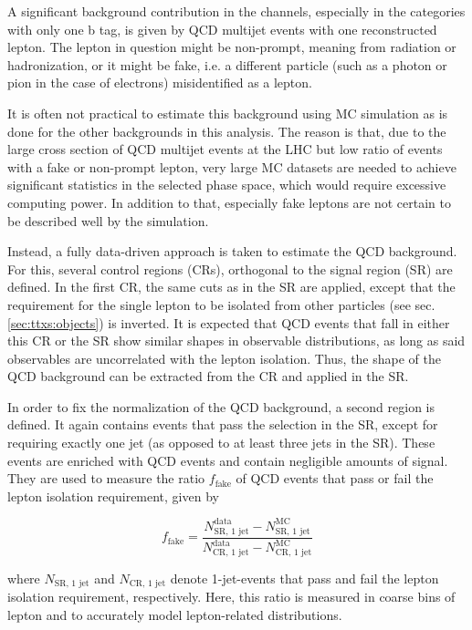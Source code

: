 A significant background contribution in the \ljets channels, especially in the categories with only one b tag, is given by QCD multijet events with one reconstructed lepton. The lepton in question might be non-prompt, meaning from radiation or hadronization, or it might be fake, i.e. a different particle (such as a photon or pion in the case of electrons) misidentified as a lepton. 

It is often not practical to estimate this background using MC simulation as is done for the other backgrounds in this analysis. The reason is that, due to the large cross section of QCD multijet events at the LHC but low ratio of events with a fake or non-prompt lepton, very large MC datasets are needed to achieve significant statistics in the selected phase space, which would require excessive computing power. In addition to that, especially fake leptons are not certain to be described well by the simulation.

Instead, a fully data-driven approach is taken to estimate the QCD background. For this, several control regions (CRs), orthogonal to the signal region (SR) are defined. In the first CR, the same cuts as in the SR are applied, except that the requirement for the single lepton to be isolated from other particles (see sec. \ref{sec:ttxs:objects}) is inverted. It is expected that QCD events that fall in either this CR or the SR show similar shapes in observable distributions, as long as said observables are uncorrelated with the lepton isolation. Thus, the shape of the QCD background can be extracted from the CR and applied in the SR.

In order to fix the normalization of the QCD background, a second region is defined. It again contains events that pass the selection in the SR, except for requiring exactly one jet (as opposed to at least three jets in the SR). These events are enriched with QCD events and contain negligible amounts of \ttbar signal. They are used to measure the ratio $f_{\mathrm{fake}}$ of QCD events that pass or fail the lepton isolation requirement, given by

\begin{equation}
    f_{\mathrm{fake}} = \frac{ N_{\text{SR, 1 jet}}^{\text{data}} - N_{\text{SR, 1 jet}}^{\text{MC}} }{ N_{\text{CR, 1 jet}}^{\text{data}} - N_{\text{CR, 1 jet}}^{\text{MC}} }
\end{equation}

where $N_{\text{SR, 1 jet}}$ and $N_{\text{CR, 1 jet}}$ denote 1-jet-events that pass and fail the lepton isolation requirement, respectively. Here, this ratio is measured in coarse bins of lepton \pt and \abseta to accurately model lepton-related distributions.

